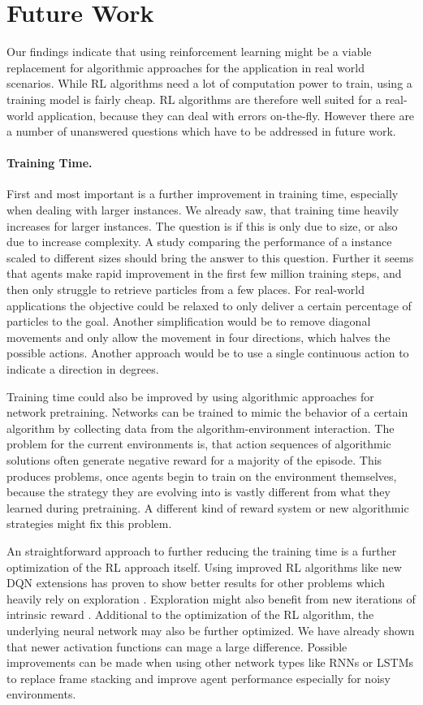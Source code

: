 \section{Future Work} \label{sec:FutureWork}
Our findings indicate that using reinforcement learning might be a viable replacement for algorithmic approaches for the application in real world scenarios. While RL algorithms need a lot of computation power to train, using a training model is fairly cheap. RL algorithms are therefore well suited for a real-world application, because they can deal with errors on-the-fly. However there are a number of unanswered questions which have to be addressed in future work.

\paragraph{Training Time.}
First and most important is a further improvement in training time, especially when dealing with larger instances. We already saw, that training time heavily increases for larger instances. The question is if this is only due to size, or also due to increase complexity. A study comparing the performance of a instance scaled to different sizes should bring the answer to this question. Further it seems that agents make rapid improvement in the first few million training steps, and then only struggle to retrieve particles from a few places. For real-world applications the objective could be relaxed to only deliver a certain percentage of particles to the goal. Another simplification would be to remove diagonal movements and only allow the movement in four directions, which halves the possible actions. Another approach would be to use a single continuous action to indicate a direction in degrees.

Training time could also be improved by using algorithmic approaches for network pretraining. Networks can be trained to mimic the behavior of a certain algorithm by collecting data from the algorithm-environment interaction. The problem for the current environments is, that action sequences of algorithmic solutions often generate negative reward for a majority of the episode. This produces problems, once agents begin to train on the environment themselves, because the strategy they are evolving into is vastly different from what they learned during pretraining. A different kind of reward system or new algorithmic strategies might fix this problem.

An straightforward approach to further reducing the training time is a further optimization of the RL approach itself. Using improved RL algorithms like new DQN extensions has proven to show better results for other problems which heavily rely on exploration \cite{badia2020agent57}. Exploration might also benefit from new iterations of intrinsic reward \cite{badia2020never}. Additional to the optimization of the RL algorithm, the underlying neural network may also be further optimized. We have already shown that newer activation functions can mage a large difference. Possible improvements can be made when using other network types like RNNs or LSTMs to replace frame stacking and improve agent performance especially for noisy environments.

